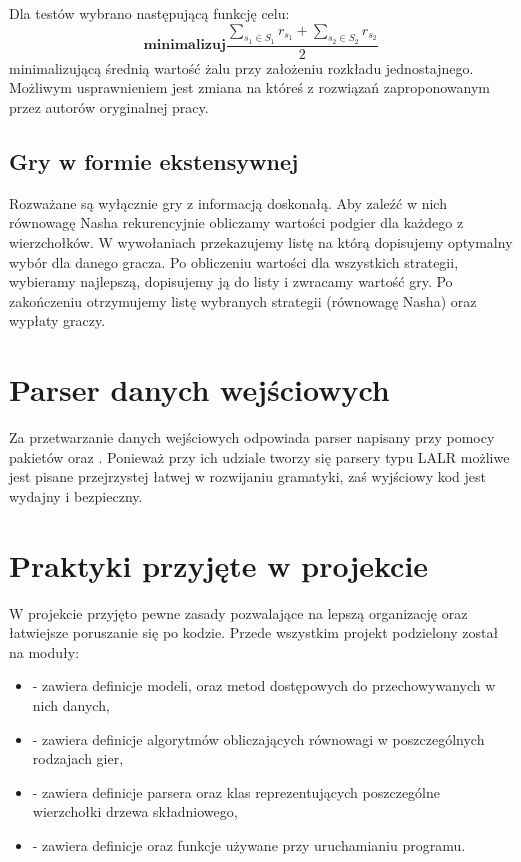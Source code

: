 \documentclass[polish]{standalone}
\begin{document}
Dla testów wybrano następującą funkcję celu:
$$\textbf{minimalizuj} \frac{\sum_{s_1 \in S_1} r_{s_1} + \sum_{s_2 \in S_2} r_{s_2}}{2}$$
minimalizującą średnią wartość żalu przy założeniu rozkładu jednostajnego. Możliwym usprawnieniem jest zmiana na któreś
z rozwiązań zaproponowanym przez autorów oryginalnej pracy.

\subsection{Gry w formie ekstensywnej}

Rozważane są wyłącznie gry z informacją doskonałą. Aby zaleźć w nich równowagę Nasha rekurencyjnie obliczamy wartości
podgier dla każdego z wierzchołków. W wywołaniach przekazujemy listę na którą dopisujemy optymalny wybór dla danego
gracza. Po obliczeniu wartości dla wszystkich strategii, wybieramy najlepszą, dopisujemy ją do listy i zwracamy wartość
gry. Po zakończeniu otrzymujemy listę wybranych strategii (równowagę Nasha) oraz wypłaty graczy.

\section{Parser danych wejściowych}

Za przetwarzanie danych wejściowych odpowiada parser napisany przy pomocy pakietów  oraz . Ponieważ
przy ich udziale tworzy się parsery typu LALR możliwe jest pisane przejrzystej łatwej w rozwijaniu gramatyki, zaś 
wyjściowy kod jest wydajny i bezpieczny.

\section{Praktyki przyjęte w projekcie}

W projekcie przyjęto pewne zasady pozwalające na lepszą organizację oraz łatwiejsze poruszanie się po kodzie. Przede
wszystkim projekt podzielony został na moduły:
\begin{itemize}
\item {} - zawiera definicje modeli, oraz metod dostępowych do przechowywanych w nich danych,
\item {} - zawiera definicje algorytmów obliczających równowagi w poszczególnych rodzajach gier,
\item {} - zawiera definicje parsera oraz klas reprezentujących poszczególne wierzchołki drzewa składniowego,
\item {} - zawiera definicje oraz funkcje używane przy uruchamianiu programu.
\end{itemize}
\end{document}
